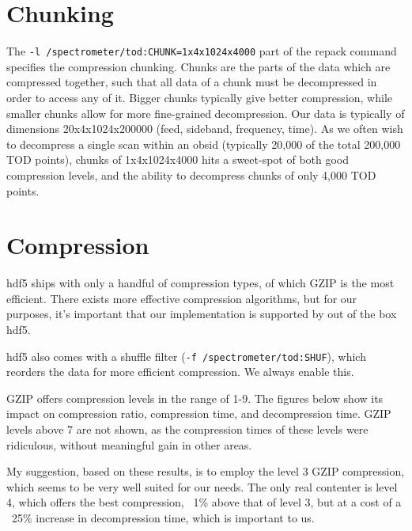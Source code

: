 \documentclass[10pt, a4paper]{article}
\begin{document}
\section{Chunking}
The \texttt{-l /spectrometer/tod:CHUNK=1x4x1024x4000} part of the repack command specifies the compression chunking. Chunks are the parts of the data which are compressed together, such that all data of a chunk must be decompressed in order to access any of it. Bigger chunks typically give better compression, while smaller chunks allow for more fine-grained decompression. Our data is typically of dimensions 20x4x1024x200000 (feed, sideband, frequency, time). As we often wish to decompress a single scan within an obsid (typically 20,000 of the total 200,000 TOD points), chunks of 1x4x1024x4000 hits a sweet-spot of both good compression levels, and the ability to decompress chunks of only 4,000 TOD points.


\section*{Compression}
hdf5 ships with only a handful of compression types, of which GZIP is the most efficient. There exists more effective compression algorithms, but for our purposes, it's important that our implementation is supported by out of the box hdf5.

hdf5 also comes with a shuffle filter (\texttt{-f /spectrometer/tod:SHUF}), which reorders the data for more efficient compression. We always enable this.

GZIP offers compression levels in the range of 1-9. The figures below show its impact on compression ratio, compression time, and decompression time. GZIP levels above 7 are not shown, as the compression times of these levels were ridiculous, without meaningful gain in other areas.

My suggestion, based on these results, is to employ the level 3 GZIP compression, which seems to be very well suited for our needs. The only real contenter is level 4, which offers the best compression, ~1\% above that of level 3, but at a cost of a ~25\% increase in decompression time, which is important to us.
\end{document}
